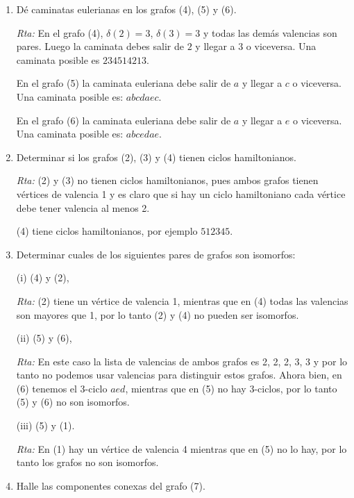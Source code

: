 \documentclass[a4paper,12pt,twoside,spanish,reqno]{amsbook}
\numberwithin{equation}{section}
\newcommand{\rta}{\noindent\textit{Rta: }}
\begin{document}
\begin{enumerate}
\begin{enumerate}
        
        \item Dé caminatas eulerianas en los grafos (4), (5) y (6).
        
        \rta  En  el  grafo (4), $\delta(2)=3$, $\delta(3)=3$ y todas las demás valencias son pares. Luego la caminata debes salir de $2$ y llegar a $3$ o viceversa. Una caminata posible es $234514213$.    
        
        En  el grafo (5) la caminata euleriana debe salir de $a$ y llegar a $c$ o viceversa. Una caminata posible es: $abcdaec$.
        
        En  el grafo (6) la caminata euleriana debe salir de $a$ y llegar a $e$ o viceversa. Una caminata posible es: $abcedae$.
        
        \item  Determinar si los grafos (2), (3) y (4) tienen ciclos hamiltonianos.
        
        \rta (2) y (3) no tienen ciclos hamiltonianos, pues ambos grafos tienen vértices de valencia 1 y  es claro que si hay un ciclo hamiltoniano cada vértice debe tener valencia al menos 2. 

        (4) tiene ciclos hamiltonianos, por ejemplo $512345$.
        
        
        \item Determinar cuales de los siguientes pares de grafos son isomorfos:
        
        (i) (4) y (2),\quad 
        
        \rta (2) tiene un vértice de  valencia 1, mientras que en  (4) todas las valencias son mayores que 1, por lo tanto (2) y (4) no pueden ser isomorfos. 
        
        (ii) (5) y (6), \quad 
        
        \rta En este caso  la lista de valencias de ambos grafos es 2, 2, 2, 3, 3 y por lo tanto no podemos usar valencias para distinguir estos grafos. Ahora bien, en (6) tenemos el 3-ciclo $aed$, mientras que en (5) no hay 3-ciclos, por lo tanto (5) y (6) no son isomorfos.   
        
        (iii) (5) y (1). 
        
        \rta 
        En (1) hay un vértice de valencia 4 mientras que  en (5) no lo hay, por lo tanto los grafos no son isomorfos. 
        
        
        
        \item Halle las componentes conexas del grafo (7).
        

\end{enumerate}
\end{enumerate}
\end{document}
